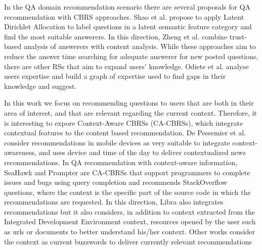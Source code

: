 \documentclass[preprint]{elsarticle}
\begin{document}
\begin{spacing}{1.5}
In the QA domain recommendation scenario there are several proposals for QA recommendation with CBRS approaches. Shao et al.\cite{Shao2017} propose to apply Latent Dirichlet Allocation to label questions in a latent semantic feature category and find the most suitable answerers. In this direction, Zheng et al. \cite{Zheng2015b} combine trust-based analysis of answerers with content analysis. While these approaches aim to reduce the answer time searching for adequate answerer for new posted questions, there are other RSs that aim to expand users' knowledge. Odiete et al. \cite{Odiete2017} analyse users expertise and build a graph of expertise used to find gaps in their knowledge and suggest.



In this work we focus on recommending questions to users that are both in their area of interest, and that are relevant regarding the current context. Therefore, it is interesting to expore Context-Aware CBRSs (CA-CBRSs), which integrate contextual features to the content based recommendation. De Pessemier et al. \cite{DePessemier2016} consider recommendations in mobile devices as very suitable to integrate context-awareness, and uses device and time of the day to deliver contextualized news recommendations. In QA recommendation with context-aware information, SeaHawk \cite{Ponzanelli2014} and Prompter \cite{Ponzanelli2014b} are CA-CBRSs that support programmers to complete issues and bugs using query completion and recommends StackOverflow questions, where the context is the specific part of the source code in which the recommendations are requested. In this direction, Libra \cite{Ponzanelli2017} also integrates recommendations but it also considers, in addition to context extracted from the Integrated Development Environment context, resources opened by the user such as urls or documents to better understand his/her context. Other works consider the context as current buzzwords to deliver currently relevant recommendations \cite{Parikh2009}


\end{spacing}
\end{document}
